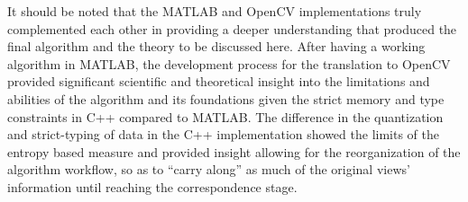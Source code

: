 It should be noted that the MATLAB\textsuperscript{\textregistered} and OpenCV implementations truly complemented each other in providing a deeper understanding that produced the final algorithm and the theory to be discussed here. After having a working algorithm in MATLAB\textsuperscript{\textregistered}, the development process for the translation to OpenCV provided significant scientific and theoretical insight into the limitations and abilities of the algorithm and its foundations given the strict memory and type constraints in C++ compared to MATLAB\textsuperscript{\textregistered}. The difference in the quantization and strict-typing of data in the C++ implementation showed the limits of the entropy based measure and provided insight allowing for the reorganization of the algorithm workflow, so as to ``carry along'' as much of the original views' information until reaching the correspondence stage.




